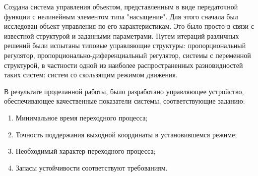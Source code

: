 
Создана система управления объектом, представленным в виде передаточной функции с нелинейным элементом типа "насыщение". Для этого сначала был исследован объект управления по его характеристикам. Это было просто в связи с известной структурой и заданными параметрами. 
Путем итераций различных решений были испытаны типовые управляющие структуры: пропорциональный регулятор, пропорционально-диференциальный регулятор, системы с переменной структурой, в частности одной из наиболее распространенных разновидностей таких систем: систем со скользящим режимом движения.

В результате проделанной работы, было разработано управляющее устройство, обеспечивающее качественные показатели системы, соответствующие заданию:
\begin{enumerate}
	\item 
	Минимальное время переходного процесса;
	\item 
	Точность поддержания выходной координаты в установившемся режиме;
	\item 
	Необходимый характер переходного процесса;
	\item
	Запасы устойчивости соответствуют требованиям.
\end{enumerate}
